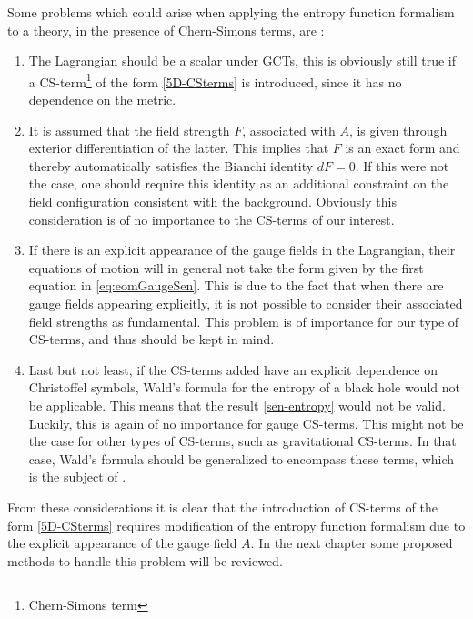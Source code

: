 \documentclass[12pt,twoside]{book}
\begin{document}
\noindent
Some problems which could arise when applying the entropy function formalism to a theory, in the presence of Chern-Simons terms, are \cite{Sen:2007fk}:
\begin{enumerate}
\item
The Lagrangian should be a scalar under GCTs, this is obviously still true if a CS-term\footnote{Chern-Simons term} of the form \eqref{5D-CSterms} is introduced, since it has no dependence on the metric.

\item
It is assumed that the field strength $F$, associated with $A$, is given through exterior differentiation of the latter. This implies that $F$ is an exact form and thereby automatically satisfies the Bianchi identity $dF = 0$. If this were not the case, one should require this identity as an additional constraint on the field configuration consistent with the background. Obviously this consideration is of no importance to the CS-terms of our interest.

\item
If there is an explicit appearance of the gauge fields in the Lagrangian, their equations of motion will in general not take the form given by the first equation in \eqref{eq:eomGaugeSen}. This is due to the fact that when there are gauge fields appearing explicitly, it is not possible to consider their associated field strengths as fundamental. This problem is of importance for our type of CS-terms, and thus should be kept in mind.

\item
Last but not least, if the CS-terms added have an explicit dependence on Christoffel symbols, Wald's formula for the entropy of a black hole would not be applicable. This means that the result \eqref{sen-entropy} would not be valid. Luckily, this is again of no importance for gauge CS-terms. This might not be the case for other types of CS-terms, such as gravitational CS-terms. In that case, Wald's formula should be generalized to encompass these terms, which is the subject of \cite{Tachikawa:2006sz}.
\end{enumerate}

From these considerations it is clear that the introduction of CS-terms of the form \eqref{5D-CSterms} requires modification of the entropy function formalism due to the explicit appearance of the gauge field $A$. In the next chapter some proposed methods to handle this problem will be reviewed.\newline
\end{document}
